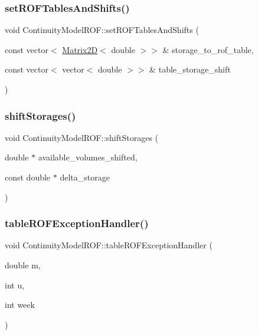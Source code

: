 \subsubsection{\texorpdfstring{set\+R\+O\+F\+Tables\+And\+Shifts()}{setROFTablesAndShifts()}}
{\footnotesize\ttfamily void Continuity\+Model\+R\+O\+F\+::set\+R\+O\+F\+Tables\+And\+Shifts (\begin{DoxyParamCaption}\item[{const vector$<$ \mbox{\hyperlink{classMatrix2D}{Matrix2D}}$<$ double $>$$>$ \&}]{storage\+\_\+to\+\_\+rof\+\_\+table,  }\item[{const vector$<$ vector$<$ double $>$$>$ \&}]{table\+\_\+storage\+\_\+shift }\end{DoxyParamCaption})}

\mbox{\label{classContinuityModelROF_a4f2b25687bcdeb4a88e22397c84789de}} 
\subsubsection{\texorpdfstring{shift\+Storages()}{shiftStorages()}}
{\footnotesize\ttfamily void Continuity\+Model\+R\+O\+F\+::shift\+Storages (\begin{DoxyParamCaption}\item[{double $\ast$}]{available\+\_\+volumes\+\_\+shifted,  }\item[{const double $\ast$}]{delta\+\_\+storage }\end{DoxyParamCaption})}

\mbox{\label{classContinuityModelROF_a10a8a95f3177d305d3881e654f01d65d}} 
\subsubsection{\texorpdfstring{table\+R\+O\+F\+Exception\+Handler()}{tableROFExceptionHandler()}}
{\footnotesize\ttfamily void Continuity\+Model\+R\+O\+F\+::table\+R\+O\+F\+Exception\+Handler (\begin{DoxyParamCaption}\item[{double}]{m,  }\item[{int}]{u,  }\item[{int}]{week }\end{DoxyParamCaption})}

